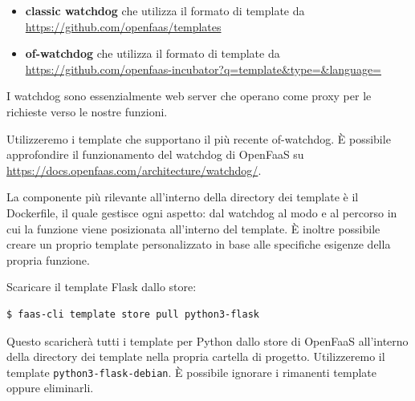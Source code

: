 \documentclass[11pt, a4paper]{article}
\begin{document}
\begin{itemize}[noitemsep]
  \item \textbf{classic watchdog} che utilizza il formato di template da\\
  \url{https://github.com/openfaas/templates}
  \item \textbf{of-watchdog} che utilizza il formato di template da\\
  \url{https://github.com/openfaas-incubator?q=template&type=&language=}
\end{itemize}

I watchdog sono essenzialmente web server che operano come proxy per le richieste verso le nostre funzioni.

Utilizzeremo i template che supportano il più recente of-watchdog. È possibile approfondire il funzionamento del watchdog di OpenFaaS su\\
\url{https://docs.openfaas.com/architecture/watchdog/}.

La componente più rilevante all'interno della directory dei template è il Dockerfile, il quale gestisce ogni aspetto: dal watchdog al modo e al percorso in cui la funzione viene posizionata all'interno del template. È inoltre possibile creare un proprio template personalizzato in base alle specifiche esigenze della propria funzione.

Scaricare il template Flask dallo store:

\begin{lstlisting}[language=bash]
$ faas-cli template store pull python3-flask
\end{lstlisting}

Questo scaricherà tutti i template per Python dallo store di OpenFaaS all'interno della directory dei template nella propria cartella di progetto. Utilizzeremo il template \texttt{python3-flask-debian}. È possibile ignorare i rimanenti template oppure eliminarli.


\end{document}
